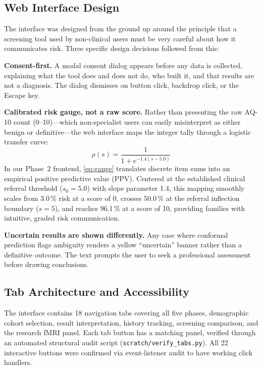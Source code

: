 \documentclass[conference]{IEEEtran}
\begin{document}
\subsection{Web Interface Design}

The interface was designed from the ground up around the principle that
a screening tool used by non-clinical users must be very careful about
how it communicates risk. Three specific design decisions followed from
this:

\textbf{Consent-first.} A modal consent dialog appears before any data
is collected, explaining what the tool does and does not do, who built
it, and that results are not a diagnosis. The dialog dismisses on
button click, backdrop click, or the Escape key.

\textbf{Calibrated risk gauge, not a raw score.} Rather than presenting the raw AQ-10 count (0--10)---which non-specialist users can easily misinterpret as either benign or definitive---the web interface maps the integer tally through a logistic transfer curve:
\begin{equation}
  \rho(s) = \frac{1}{1 + e^{-1.4(s - 5.0)}}
  \label{eq:gauge}
\end{equation}
In our Phase~2 frontend, \eqref{eq:gauge} translates discrete item sums into an empirical positive predictive value (PPV). Centered at the established clinical referral threshold ($s_0 = 5.0$) with slope parameter 1.4, this mapping smoothly scales from 3.0\,\% risk at a score of 0, crosses 50.0\,\% at the referral inflection boundary ($s = 5$), and reaches 96.1\,\% at a score of 10, providing families with intuitive, graded risk communication.

\textbf{Uncertain results are shown differently.} Any case where
conformal prediction flags ambiguity renders a yellow ``uncertain''
banner rather than a definitive outcome. The text prompts the user to
seek a professional assessment before drawing conclusions.

\subsection{Tab Architecture and Accessibility}

The interface contains 18 navigation tabs covering all five phases,
demographic cohort selection, result interpretation, history tracking,
screening comparison, and the research fMRI panel. Each tab button has
a matching panel, verified through an automated structural audit
script (\texttt{scratch/verify\_tabs.py}). All 22 interactive buttons
were confirmed via event-listener audit to have working click handlers.
\end{document}
